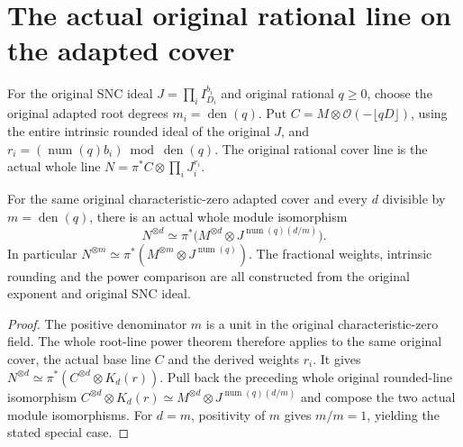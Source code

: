 \section{The actual original rational line on the adapted cover}

\begin{definition}
\label{def:kn-nadel-original-rounded-cover-line}
\leanok
For the original SNC ideal $J=\prod_iI_{D_i}^{b_i}$ and original
rational $q\geq0$, choose the original adapted root degrees
$m_i=\operatorname{den}(q)$. Put
$C=M\otimes\mathcal O(-\lfloor qD\rfloor)$, using the entire intrinsic
rounded ideal of the original $J$, and
$r_i=(\operatorname{num}(q)b_i)\bmod\operatorname{den}(q)$.
The original rational cover line is the actual whole line
$N=\pi^*C\otimes\prod_iJ_i^{r_i}$.
\end{definition}

\begin{lemma}
\label{lem:kn-nadel-original-rounded-cover-power}
\leanok
{}
For the same original characteristic-zero adapted cover and every
$d$ divisible by $m=\operatorname{den}(q)$, there is an actual whole
module isomorphism
\[
 N^{\otimes d}\simeq
 \pi^*\bigl(M^{\otimes d}\otimes J^{\operatorname{num}(q)(d/m)}\bigr).
\]
In particular $N^{\otimes m}\simeq\pi^*(M^{\otimes m}\otimes J^{\operatorname{num}(q)})$.
The fractional weights, intrinsic rounding and the power comparison are
all constructed from the original exponent and original SNC ideal.
\end{lemma}
\begin{proof}
The positive denominator $m$ is a unit in the original characteristic-zero
field. The whole root-line power theorem therefore applies to the same
original cover, the actual base line $C$ and the derived weights $r_i$.
It gives $N^{\otimes d}\simeq\pi^*(C^{\otimes d}\otimes K_d(r))$.
Pull back the preceding whole original rounded-line isomorphism
$C^{\otimes d}\otimes K_d(r)\simeq M^{\otimes d}\otimes J^{\operatorname{num}(q)(d/m)}$
and compose the two actual module isomorphisms. For $d=m$, positivity
of $m$ gives $m/m=1$, yielding the stated special case.
\end{proof}
